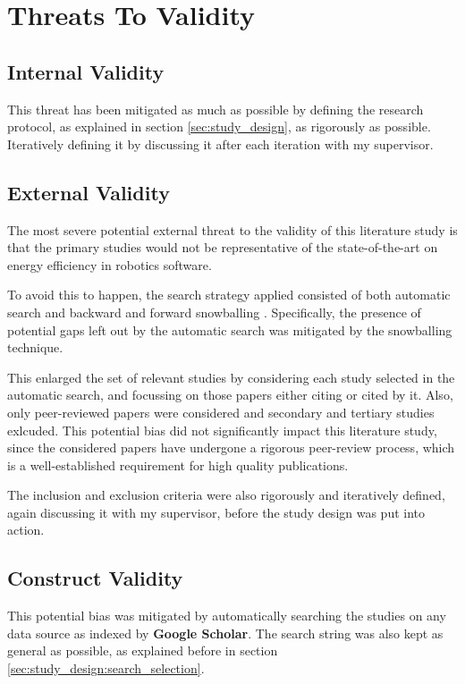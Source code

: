 \section{Threats To Validity}\label{sec:threats}
\subsection{Internal Validity}
This threat has been mitigated as much as possible by defining the research protocol, as explained in section \ref{sec:study_design}, 
as rigorously as possible.
Iteratively defining it by discussing it after each iteration with my supervisor.

\subsection{External Validity}
The most severe potential external threat to the validity of this literature study is that the primary studies would not 
be representative of the state-of-the-art on energy efficiency in robotics software.

To avoid this to happen, the search strategy applied consisted of both automatic search and backward and forward snowballing 
\cite{wohlin2014snowballing}. Specifically, the presence of potential gaps left out by the automatic search was mitigated by 
the snowballing technique. 

This enlarged the set of relevant studies by considering each study selected in the automatic search, 
and focussing on those papers either citing or cited by it. 
Also, only peer-reviewed papers were considered and secondary and tertiary studies exlcuded.
This potential bias did not significantly impact this literature study, since the considered papers have undergone a rigorous
peer-review process, which is a well-established requirement for high quality publications. 

The inclusion and exclusion criteria were also rigorously and iteratively defined, again discussing it with my supervisor,
before the study design was put into action.

\subsection{Construct Validity}
This potential bias was mitigated by automatically searching the studies on any data source as indexed by \textbf{Google Scholar}.
The search string was also kept as general as possible, as explained before in section \ref{sec:study_design:search_selection}.

